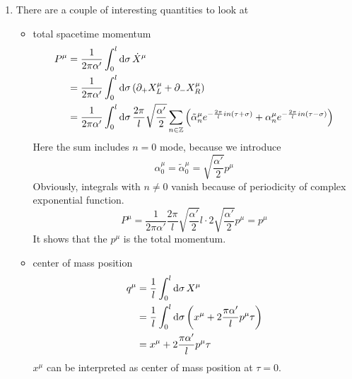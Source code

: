 \begin{enumerate}[label=(\alph*)]
	\item There are a couple of interesting quantities to look at

		\begin{itemize}
			\item  total spacetime momentum
				\begin{align*}
					P^\mu &= \frac{1}{2\pi\alpha'} \int^l_0 \dd{\sigma} \dot{X}^\mu \\
							&= \frac{1}{2\pi\alpha'} \int ^l_0 \dd{\sigma} (\partial_+ X^\mu_L + \partial_- X^\mu_R) \\
							&=\frac{1}{2\pi\alpha'} \int ^l_0 \dd{\sigma} \frac{2\pi}{l} \sqrt{\frac{\alpha'}{2}} \sum_{n \in \mathbb{Z}} \left(  \tilde{\alpha}^\mu_n e^{- \frac{2\pi}{l} i n (\tau+\sigma)}  + {\alpha}^\mu_n e^{- \frac{2\pi}{l} i n (\tau - \sigma)}  \right)
				\end{align*}
				Here the sum includes $n=0$ mode, because we introduce
				\begin{equation*}
					\alpha_0^\mu = \tilde{\alpha}^\mu_0 = \sqrt{\frac{\alpha'}{2}} p^\mu
				\end{equation*}
				Obviously, integrals with $n\neq 0$ vanish because of periodicity of complex exponential function. 
				\begin{equation}
					P^\mu = \frac{1}{2\pi\alpha'} \frac{2\pi}{l} \sqrt{\frac{\alpha'}{2}} l \cdot 2 \sqrt{\frac{\alpha'}{2}} p^\mu = p^\mu
				\end{equation}
				It shows that the $p^\mu$ is the total momentum.
			\item center of mass position
				\begin{align}
					q^\mu &= \frac{1}{l} \int_0^l \dd{\sigma} X^\mu \notag \\
							&= \frac{1}l \int_0^l \dd{\sigma} \left( x^\mu + 2 \frac{\pi \alpha'}{l} p^\mu \tau   \right) \notag \\
							&= x^\mu + 2 \frac{\pi\alpha'}{l} p^\mu \tau
				\end{align}
				$x^\mu$ can be interpreted as center of mass position at $\tau=0$.


\end{itemize}
\end{enumerate}
